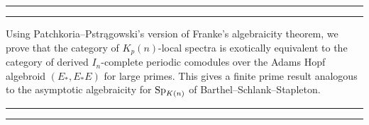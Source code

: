 

\vspace*{5cm}

{\par{}\par}
\vspace{-2em}
\rule[-11pt]{\textwidth}{1pt}
\rule{\textwidth}{0.5pt}
    
Using Patchkoria--Pstr{\k a}gowski's version of Franke's algebraicity theorem, we prove that the category of $K_p(n)$-local spectra is exotically equivalent to the category of derived $I_n$-complete periodic comodules over the Adams Hopf algebroid $(E_*, E_*E)$ for large primes. This gives a finite prime result analogous to the asymptotic algebraicity for $\mathrm{Sp}_{K(n)}$ of Barthel--Schlank--Stapleton. 

\rule{\textwidth}{0.5pt}
\rule[11pt]{\textwidth}{1pt}
\vspace{\fill}
